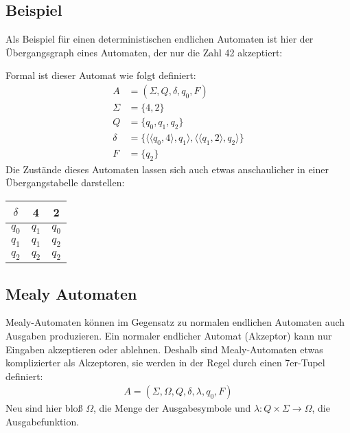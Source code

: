 \subsection{Beispiel}
\begin{flushleft}
    Als Beispiel für einen deterministischen endlichen Automaten ist hier der Übergangsgraph eines
    Automaten, der nur die Zahl 42 akzeptiert:
    \begin{center}
    \end{center}
    Formal ist dieser Automat wie folgt definiert:
    \begin{align}
        A &= (\Sigma,Q,\delta,q_0,F) \\
        \Sigma &= \{4,2\} \\
        Q &= \{q_0,q_1,q_2\} \\
        \delta &= \{\langle \langle q_0, 4 \rangle, q_1 \rangle, \langle \langle q_1, 2 \rangle, q_2 \rangle \} \\
        F &= \{q_2\}
    \end{align}
    Die Zustände dieses Automaten lassen sich auch etwas anschaulicher in einer Übergangstabelle darstellen:
    \begin{center}
        \begin{tabular}{|c|c|c|}
            \hline
            $\delta$ & 4 & 2 \\
            \hline
            $q_0$ & $q_1$ & $q_0$ \\
            \hline
            $q_1$ & $q_1$ & $q_2$ \\
            \hline
            $q_2$ & $q_2$ & $q_2$ \\
            \hline
        \end{tabular}
    \end{center}
\end{flushleft}

\subsection{Mealy Automaten}
\begin{flushleft}
    Mealy-Automaten können im Gegensatz zu normalen endlichen Automaten auch Ausgaben produzieren.
    Ein normaler endlicher Automat (Akzeptor) kann nur Eingaben akzeptieren oder ablehnen.
    Deshalb sind Mealy-Automaten etwas komplizierter als Akzeptoren, sie werden in der Regel durch einen 7er-Tupel definiert:
    \begin{align}
        A=(\Sigma,\Omega,Q,\delta,\lambda,q_0,F)
    \end{align}
    Neu sind hier bloß $\Omega$, die Menge der Ausgabesymbole und $\lambda: Q \times \Sigma \rightarrow \Omega$, die Ausgabefunktion.
\end{flushleft}

